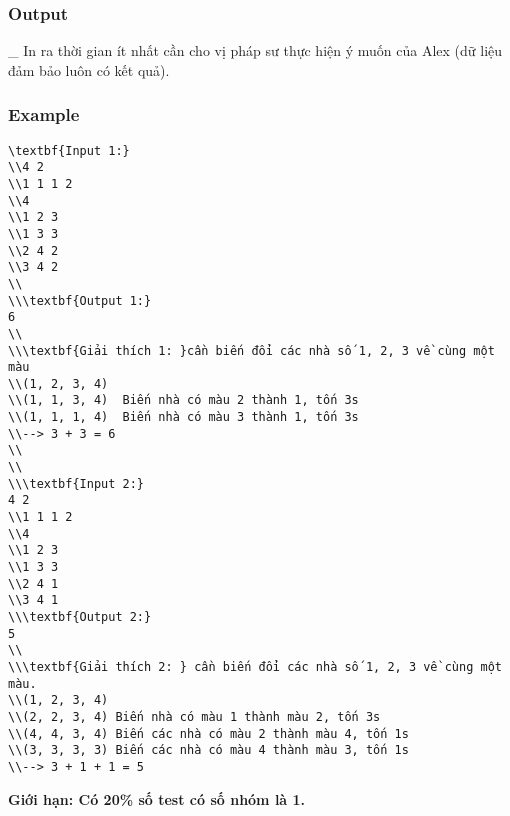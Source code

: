 \subsubsection{   Output  }

   \_ In ra thời gian ít nhất cần cho vị pháp sư thực hiện ý muốn của Alex (dữ liệu đảm bảo luôn có kết quả).  



\subsubsection{   Example  }
\begin{verbatim}
\textbf{Input 1:}
\\4 2 
\\1 1 1 2
\\4
\\1 2 3
\\1 3 3
\\2 4 2
\\3 4 2
\\
\\\textbf{Output 1:}
6
\\
\\\textbf{Giải thích 1: }cần biến đổi các nhà số 1, 2, 3 về cùng một màu
\\(1, 2, 3, 4)
\\(1, 1, 3, 4)  Biến nhà có màu 2 thành 1, tốn 3s
\\(1, 1, 1, 4)  Biến nhà có màu 3 thành 1, tốn 3s
\\--> 3 + 3 = 6
\\
\\
\\\textbf{Input 2:}
4 2 
\\1 1 1 2
\\4
\\1 2 3
\\1 3 3
\\2 4 1
\\3 4 1
\\\textbf{Output 2:}
5 
\\
\\\textbf{Giải thích 2: } cần biến đổi các nhà số 1, 2, 3 về cùng một màu.
\\(1, 2, 3, 4)
\\(2, 2, 3, 4) Biến nhà có màu 1 thành màu 2, tốn 3s
\\(4, 4, 3, 4) Biến các nhà có màu 2 thành màu 4, tốn 1s
\\(3, 3, 3, 3) Biến các nhà có màu 4 thành màu 3, tốn 1s
\\--> 3 + 1 + 1 = 5\end{verbatim}

\textbf{      Giới hạn:\textbf{}     Có 20\% số test có số nhóm là 1.    }
